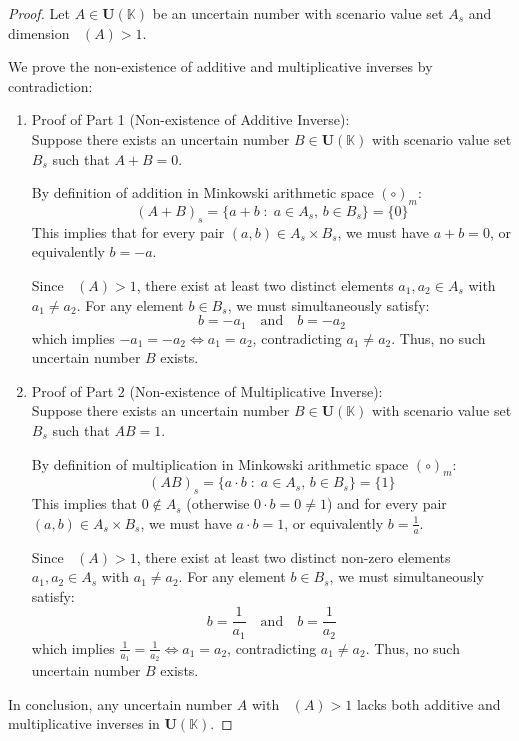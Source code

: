 \documentclass[a4paper,12pt, twoside]{memoir}
\DeclareMathOperator{\dimU}{\dim_U}
\newcommand{\tsbd}[1]{\mathbf{U}(\mathbb{#1})}
\begin{document}
\begin{proof}
	Let $A \in \tsbd{K}$ be an uncertain number with scenario value set $A_s$ and dimension $\dimU(A) > 1$.

	We prove the non-existence of additive and multiplicative inverses by contradiction:

	\begin{enumerate}[leftmargin=*]
		\item Proof of Part 1 (Non-existence of Additive Inverse): \\
		      Suppose there exists an uncertain number $B \in \tsbd{K}$ with scenario value set $B_s$ such that $A + B = 0$.

		      By definition of addition in Minkowski arithmetic space $(\circ)_m$:
		      \[
			      (A + B)_s = \{a + b \;:\; a \in A_s, \, b \in B_s\} = \{0\}
		      \]
		      This implies that for every pair $(a, b) \in A_s \times B_s$, we must have $a + b = 0$, or equivalently $b = -a$.

		      Since $\dimU(A) > 1$, there exist at least two distinct elements $a_1, a_2 \in A_s$ with $a_1 \neq a_2$.
		      For any element $b \in B_s$, we must simultaneously satisfy:
		      \[
			      b = -a_1 \quad \text{and} \quad b = -a_2
		      \]
		      which implies $-a_1 = -a_2 \iff a_1 = a_2$, contradicting $a_1 \neq a_2$. Thus, no such uncertain number $B$ exists.

		\item Proof of Part 2 (Non-existence of Multiplicative Inverse): \\
		      Suppose there exists an uncertain number $B \in \tsbd{K}$ with scenario value set $B_s$ such that $AB = 1$.

		      By definition of multiplication in Minkowski arithmetic space $(\circ)_m$:
		      \[
			      (AB)_s = \{a \cdot b \;:\; a \in A_s, \, b \in B_s\} = \{1\}
		      \]
		      This implies that $0 \notin A_s$ (otherwise $0 \cdot b = 0 \neq 1$) and for every pair $(a, b) \in A_s \times B_s$, we must have $a \cdot b = 1$, or equivalently $b = \frac{1}{a}$.

		      Since $\dimU(A) > 1$, there exist at least two distinct non-zero elements $a_1, a_2 \in A_s$ with $a_1 \neq a_2$.
		      For any element $b \in B_s$, we must simultaneously satisfy:
		      \[
			      b = \frac{1}{a_1} \quad \text{and} \quad b = \frac{1}{a_2}
		      \]
		      which implies $\frac{1}{a_1} = \frac{1}{a_2} \iff a_1 = a_2$, contradicting $a_1 \neq a_2$. Thus, no such uncertain number $B$ exists.
	\end{enumerate}

	In conclusion, any uncertain number $A$ with $\dimU(A) > 1$ lacks both additive and multiplicative inverses in $\tsbd{K}$.
\end{proof}
\end{document}
